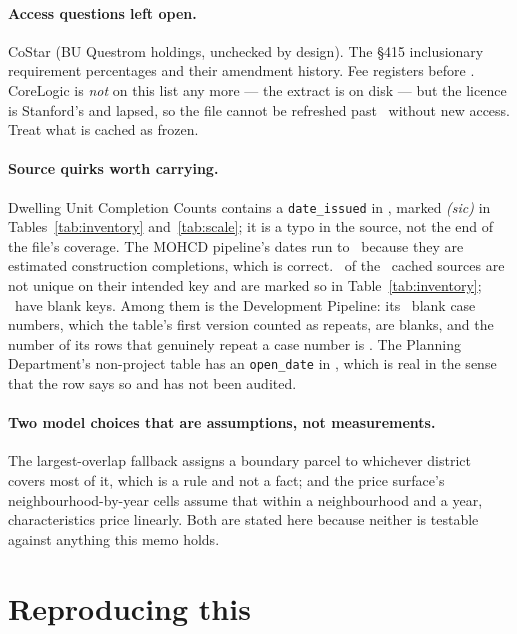 \documentclass[11pt]{article}
\begin{document}
\paragraph{Access questions left open.} CoStar (BU Questrom holdings, unchecked by design).
The \S415 inclusionary requirement percentages and their amendment history. Fee registers
before \acqFeeFirst. CoreLogic is \emph{not} on this list any more --- the extract is on
disk --- but the licence is Stanford's and lapsed, so the file cannot be refreshed past
\acqClMaxDate\ without new access. Treat what is cached as frozen.

\paragraph{Source quirks worth carrying.} Dwelling Unit Completion Counts contains a
\texttt{date\_issued} in \acqUcMaxYear, marked \emph{(sic)} in Tables~\ref{tab:inventory}
and~\ref{tab:scale}; it is a typo in the source, not the end of the file's coverage. The MOHCD
pipeline's dates run to \acqMohcdMaxYear\ because they are estimated construction completions,
which is
correct. \acqNonUniqueSources\ of the \acqSourcesCached\ cached sources are not unique on
their intended key and are marked so in Table~\ref{tab:inventory}; \acqNullKeySources\ have
blank keys. Among them is the Development Pipeline: its \acqPipelineNullKeys\ blank case
numbers, which the table's first version counted as repeats, are blanks, and the number of its
rows that genuinely repeat a case number is \acqPipelineDupRows. The Planning Department's non-project table has an
\texttt{open\_date} in \acqNpMinYear, which is real in the sense that the row says so and has
not been audited.

\paragraph{Two model choices that are assumptions, not measurements.} The largest-overlap
fallback assigns a boundary parcel to whichever district covers most of it, which is a rule
and not a fact; and the price surface's neighbourhood-by-year cells assume that within a
neighbourhood and a year, characteristics price linearly. Both are stated here because
neither is testable against anything this memo holds.

\section{Reproducing this}
\end{document}
